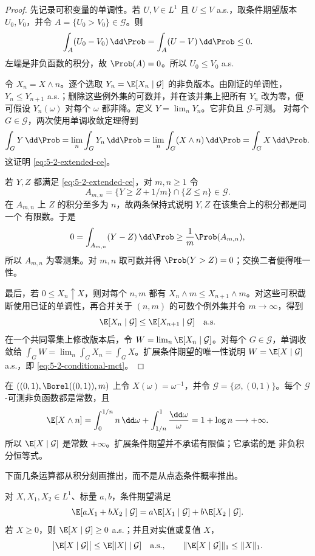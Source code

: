 \begin{proof}
先记录可积变量的单调性。若 $U,V\in L^1$ 且 $U\leq V$ a.s.，取条件期望版本
$U_0,V_0$，并令 $A=\{U_0>V_0\}\in\mathcal G$。则
\[
 \int_A(U_0-V_0)\,\dd\Prob
 =\int_A(U-V)\,\dd\Prob\leq0.
\]
左端是非负函数的积分，故 $\Prob(A)=0$。所以 $U_0\leq V_0$ a.s.

令 $X_n=X\wedge n$。逐个选取 $Y_n=\E[X_n\mid\mathcal G]$ 的非负版本。由刚证的单调性，
$Y_n\leq Y_{n+1}$ a.s.；删除这些例外集的可数并，并在该并集上把所有 $Y_n$ 改为零，便可假设
$Y_n(\omega)$ 对每个 $\omega$ 都非降。定义 $Y=\lim_nY_n$。它非负且 $\mathcal G$-可测。
对每个 $G\in\mathcal G$，两次使用单调收敛定理得到
\[
 \int_GY\,\dd\Prob
 =\lim_n\int_GY_n\,\dd\Prob
 =\lim_n\int_G(X\wedge n)\,\dd\Prob
 =\int_GX\,\dd\Prob.
\]
这证明 \eqref{eq:5-2-extended-ce}。

若 $Y,Z$ 都满足 \eqref{eq:5-2-extended-ce}，对 $m,n\geq1$ 令
\[
 A_{m,n}=\{Y\geq Z+1/m\}\cap\{Z\leq n\}\in\mathcal G.
\]
在 $A_{m,n}$ 上 $Z$ 的积分至多为 $n$，故两条保持式说明 $Y,Z$ 在该集合上的积分都是同一个
有限数。于是
\[
 0=\int_{A_{m,n}}(Y-Z)\,\dd\Prob
 \geq \frac1m\Prob(A_{m,n}),
\]
所以 $A_{m,n}$ 为零测集。对 $m,n$ 取可数并得 $\Prob(Y>Z)=0$；交换二者便得唯一性。

最后，若 $0\leq X_n\uparrow X$，则对每个 $n,m$ 都有
$X_n\wedge m\leq X_{n+1}\wedge m$。对这些可积截断使用已证的单调性，再合并关于
$(n,m)$ 的可数个例外集并令 $m\to\infty$，得到
\[
 \E[X_n\mid\mathcal G]\leq\E[X_{n+1}\mid\mathcal G]\quad\text{a.s.}
\]
在一个共同零集上修改版本后，令 $W=\lim_n\E[X_n\mid\mathcal G]$。对每个
$G\in\mathcal G$，单调收敛给
$\int_GW=\lim_n\int_GX_n=\int_GX$。扩展条件期望的唯一性说明
$W=\E[X\mid\mathcal G]$ a.s.，即 \eqref{eq:5-2-conditional-mct}。
\end{proof}

\begin{example}[不可积变量的条件平均可以为无穷]\label{ex:5-2-1-nonintegrable}
在 $((0,1),\Borel((0,1)),m)$ 上令 $X(\omega)=\omega^{-1}$，并令
$\mathcal G=\{\varnothing,(0,1)\}$。每个 $\mathcal G$-可测非负函数都是常数，且
\[
 \E[X\wedge n]
 =\int_0^{1/n}n\,\dd\omega+\int_{1/n}^1\frac{\dd\omega}{\omega}
 =1+\log n\longrightarrow+\infty.
\]
所以 $\E[X\mid\mathcal G]$ 是常数 $+\infty$。扩展条件期望并不承诺有限值；它承诺的是
非负积分恒等式。
\end{example}

下面几条运算都从积分刻画推出，而不是从点态条件概率推出。

\begin{proposition}[基本运算与 $L^1$ 收缩]\label{proposition:5-2-1-2}
对 $X,X_1,X_2\in L^1$、标量 $a,b$，条件期望满足
\[
 \E[aX_1+bX_2\mid\mathcal G]
 =a\E[X_1\mid\mathcal G]+b\E[X_2\mid\mathcal G].
\]
若 $X\geq0$，则 $\E[X\mid\mathcal G]\geq0$ a.s.；并且对实值或复值 $X$，
\begin{equation}\label{eq:5-2-l1-contraction}
 \bigl|\E[X\mid\mathcal G]\bigr|
 \leq\E[|X|\mid\mathcal G]\quad\text{a.s.},
 \qquad
 \|\E[X\mid\mathcal G]\|_1\leq\|X\|_1.
\end{equation}
\end{proposition}

